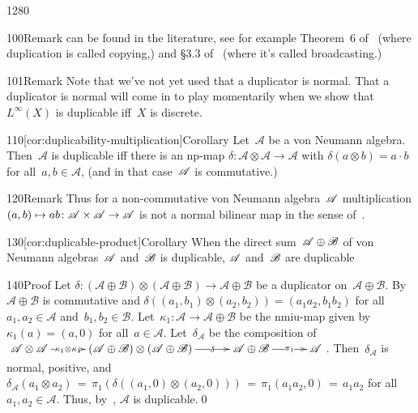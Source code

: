 \begin{parsec}{1280}
\begin{point}{100}{Remark}
can be found
in the literature,
see for example
Theorem~6 of~\cite{Maassen2010}
(where duplication is called copying,)
and \S3.3 of~\cite{clifton2003characterizing} 
    (where it's called broadcasting.)
\end{point}
\begin{point}{101}{Remark}
Note that we've not yet used that a duplicator is normal.
That a duplicator is normal will come in to play momentarily
when we show that~$L^\infty(X)$
is duplicable iff~$X$ is discrete.
\end{point}
\begin{point}{110}[cor:duplicability-multiplication]{Corollary}
Let~$\mathscr{A}$
be a von Neumann algebra.
Then~$\mathscr{A}$
is duplicable
iff there is
an np-map $\delta\colon\mathscr{A}\otimes\mathscr{A}
\to \mathscr{A}$
with $\delta(a\otimes b)=a\cdot b$ 
for all~$a,b\in\mathscr{A}$,
(and in that case~$\mathscr{A}$ is commutative.)
\begin{point}{120}{Remark}%
Thus
for a non-commutative von Neumann algebra~$\mathscr{A}$ 
multiplication $(a,b)\mapsto ab\colon \mathscr{A}\times \mathscr{A}\to\mathscr{A}$
is not a normal bilinear map
in the sense of~.
\end{point}
\end{point}
\begin{point}{130}[cor:duplicable-product]{Corollary}%
When the direct sum~$\mathscr{A}\oplus\mathscr{B}$
of von Neumann algebras~$\mathscr{A}$ and~$\mathscr{B}$
is duplicable,
$\mathscr{A}$ and~$\mathscr{B}$ are duplicable
\begin{point}{140}{Proof}%
Let $\delta\colon (\mathscr{A}\oplus\mathscr{B})\otimes
(\mathscr{A}\oplus\mathscr{B})\longrightarrow
\mathscr{A}\oplus\mathscr{B}$
be a duplicator on~$\mathscr{A}\oplus\mathscr{B}$.
By~
$\mathscr{A}\oplus\mathscr{B}$
is commutative
and $\delta((a_1,b_1)\otimes (a_2,b_2))
= (a_1a_2,b_1b_2)$
for all $a_1,a_2\in\mathscr{A}$
and~$b_1,b_2\in\mathscr{B}$.
Let~$\kappa_1\colon \mathscr{A}\to\mathscr{A}\oplus\mathscr{B}$
be the nmiu-map
given by~$\kappa_1(a)=(a,0)$ for all~$a\in\mathscr{A}$.
Let~$\delta_\mathscr{A}$ be the composition of
$\xymatrix@C=3em{
\mathscr{A}\otimes\mathscr{A}
\ar[r]|-{\kappa_1\otimes\kappa_1}
&
(\mathscr{A}\oplus\mathscr{B})
\otimes
(\mathscr{A}\oplus\mathscr{B})
\ar[r]|-{\delta}
&
\mathscr{A}\oplus\mathscr{B}
\ar[r]|-{\pi_1}
&
\mathscr{A}
}$.
Then~$\delta_\mathscr{A}$ is normal, positive,
and
$\delta_\mathscr{A}(a_1\otimes a_2)
\,=\,  \pi_1(\delta((a_1,0)\otimes (a_2,0))) 
\,=\, \pi_1(a_1a_2,0)\,=\,a_1a_2$
for all~$a_1,a_2\in\mathscr{A}$.
Thus, by~,
$\mathscr{A}$
is duplicable.\qed
\end{point}
\end{point}
\end{parsec}
